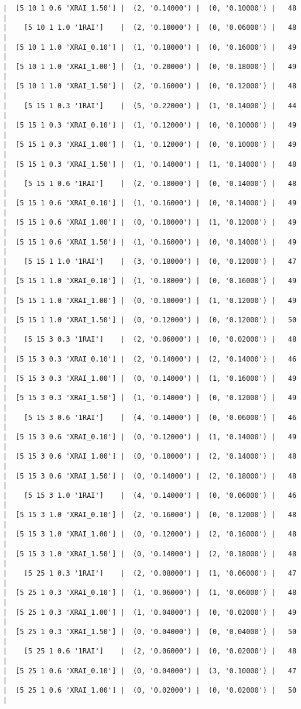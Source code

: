 \documentclass{article}
\begin{document}
\begin{verbatim}
|  [5 10 1 0.6 'XRAI_1.50'] |  (2, '0.14000') |  (0, '0.10000') |   48  |
|    [5 10 1 1.0 '1RAI']    |  (2, '0.10000') |  (0, '0.06000') |   48  |
|  [5 10 1 1.0 'XRAI_0.10'] |  (1, '0.18000') |  (0, '0.16000') |   49  |
|  [5 10 1 1.0 'XRAI_1.00'] |  (1, '0.20000') |  (0, '0.18000') |   49  |
|  [5 10 1 1.0 'XRAI_1.50'] |  (2, '0.16000') |  (0, '0.12000') |   48  |
|    [5 15 1 0.3 '1RAI']    |  (5, '0.22000') |  (1, '0.14000') |   44  |
|  [5 15 1 0.3 'XRAI_0.10'] |  (1, '0.12000') |  (0, '0.10000') |   49  |
|  [5 15 1 0.3 'XRAI_1.00'] |  (1, '0.12000') |  (0, '0.10000') |   49  |
|  [5 15 1 0.3 'XRAI_1.50'] |  (1, '0.14000') |  (1, '0.14000') |   48  |
|    [5 15 1 0.6 '1RAI']    |  (2, '0.18000') |  (0, '0.14000') |   48  |
|  [5 15 1 0.6 'XRAI_0.10'] |  (1, '0.16000') |  (0, '0.14000') |   49  |
|  [5 15 1 0.6 'XRAI_1.00'] |  (0, '0.10000') |  (1, '0.12000') |   49  |
|  [5 15 1 0.6 'XRAI_1.50'] |  (1, '0.16000') |  (0, '0.14000') |   49  |
|    [5 15 1 1.0 '1RAI']    |  (3, '0.18000') |  (0, '0.12000') |   47  |
|  [5 15 1 1.0 'XRAI_0.10'] |  (1, '0.18000') |  (0, '0.16000') |   49  |
|  [5 15 1 1.0 'XRAI_1.00'] |  (0, '0.10000') |  (1, '0.12000') |   49  |
|  [5 15 1 1.0 'XRAI_1.50'] |  (0, '0.12000') |  (0, '0.12000') |   50  |
|    [5 15 3 0.3 '1RAI']    |  (2, '0.06000') |  (0, '0.02000') |   48  |
|  [5 15 3 0.3 'XRAI_0.10'] |  (2, '0.14000') |  (2, '0.14000') |   46  |
|  [5 15 3 0.3 'XRAI_1.00'] |  (0, '0.14000') |  (1, '0.16000') |   49  |
|  [5 15 3 0.3 'XRAI_1.50'] |  (1, '0.14000') |  (0, '0.12000') |   49  |
|    [5 15 3 0.6 '1RAI']    |  (4, '0.14000') |  (0, '0.06000') |   46  |
|  [5 15 3 0.6 'XRAI_0.10'] |  (0, '0.12000') |  (1, '0.14000') |   49  |
|  [5 15 3 0.6 'XRAI_1.00'] |  (0, '0.10000') |  (2, '0.14000') |   48  |
|  [5 15 3 0.6 'XRAI_1.50'] |  (0, '0.14000') |  (2, '0.18000') |   48  |
|    [5 15 3 1.0 '1RAI']    |  (4, '0.14000') |  (0, '0.06000') |   46  |
|  [5 15 3 1.0 'XRAI_0.10'] |  (2, '0.16000') |  (0, '0.12000') |   48  |
|  [5 15 3 1.0 'XRAI_1.00'] |  (0, '0.12000') |  (2, '0.16000') |   48  |
|  [5 15 3 1.0 'XRAI_1.50'] |  (0, '0.14000') |  (2, '0.18000') |   48  |
|    [5 25 1 0.3 '1RAI']    |  (2, '0.08000') |  (1, '0.06000') |   47  |
|  [5 25 1 0.3 'XRAI_0.10'] |  (1, '0.06000') |  (1, '0.06000') |   48  |
|  [5 25 1 0.3 'XRAI_1.00'] |  (1, '0.04000') |  (0, '0.02000') |   49  |
|  [5 25 1 0.3 'XRAI_1.50'] |  (0, '0.04000') |  (0, '0.04000') |   50  |
|    [5 25 1 0.6 '1RAI']    |  (2, '0.06000') |  (0, '0.02000') |   48  |
|  [5 25 1 0.6 'XRAI_0.10'] |  (0, '0.04000') |  (3, '0.10000') |   47  |
|  [5 25 1 0.6 'XRAI_1.00'] |  (0, '0.02000') |  (0, '0.02000') |   50  |

\end{verbatim}
\end{document}
